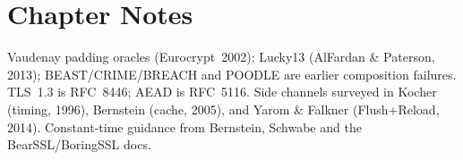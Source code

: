 \section*{Chapter Notes}
Vaudenay padding oracles (Eurocrypt~2002); Lucky13 (AlFardan \& Paterson, 2013); BEAST/CRIME/BREACH and POODLE are earlier composition failures. TLS~1.3 is RFC~8446; AEAD is RFC~5116. Side channels surveyed in Kocher (timing, 1996), Bernstein (cache, 2005), and Yarom \& Falkner (Flush+Reload, 2014). Constant-time guidance from Bernstein, Schwabe and the BearSSL/BoringSSL docs.

